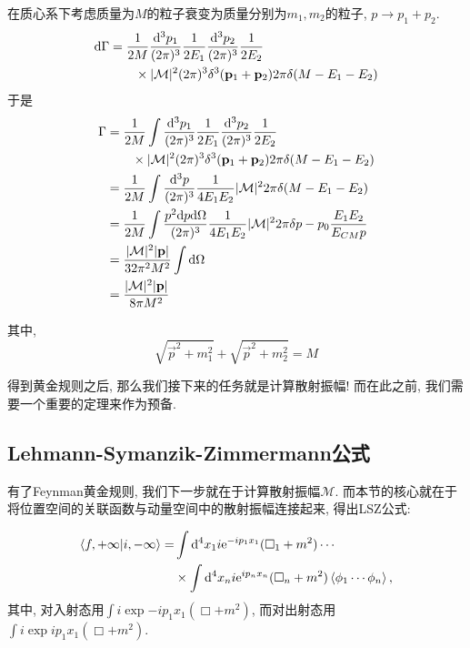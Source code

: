 \begin{example}[$1\rightarrow2$衰变]
    在质心系下考虑质量为$M$的粒子衰变为质量分别为$m_1, m_2$的粒子, $p\rightarrow p_1+p_2$.
    \begin{align}
        \mathrm d\Gamma&=\frac1{2M}\frac{\mathrm d^3p_1}{(2\pi)^{3}}\frac1{2E_1}\frac{\mathrm d^3p_2}{(2\pi)^{3}}\frac1{2E_2}\notag\\
        &\quad\quad\times|\mathcal M|^2(2\pi)^{3}\delta^3(\mathbf{p}_1+\mathbf{p}_2)2\pi\delta(M-E_1-E_2)
    \end{align}
    于是
    \begin{align}
        \Gamma&=\frac{1}{2M}\int\frac{\mathrm d^3p_1}{(2\pi)^{3}}\frac1{2E_1}\frac{\mathrm d^3p_2}{(2\pi)^{3}}\frac1{2E_2}\notag\\
        &\quad\quad\times|\mathcal M|^2(2\pi)^{3}\delta^3(\mathbf{p}_1+\mathbf{p}_2)2\pi\delta(M-E_1-E_2)\\
        &=\frac{1}{2M}\int\frac{\mathrm d^3p}{(2\pi)^{3}}\frac{1}{4E_1E_2}|\mathcal M|^2 2\pi\delta(M-E_1-E_2)\\
        &=\frac{1}{2M}\int\frac{p^2\mathrm d p\mathrm d\Omega}{(2\pi)^{3}}\frac{1}{4E_1E_2}|\mathcal M|^2 2\pi\delta{p-p_0}\frac{E_1E_2}{E_{CM}p}\\
        &=\frac{|\mathcal M|^2|\mathbf{p}|}{32\pi^2M^2}\int\mathrm d\Omega\\
        &=\frac{|\mathcal M|^2|\mathbf{p}|}{8\pi M^2}
    \end{align}

    其中, 
    \begin{equation}
        \sqrt{\vec p^2+m_1^2}+\sqrt{\vec p^2+m_2^2}=M
    \end{equation}
\end{example}

得到黄金规则之后, 那么我们接下来的任务就是计算散射振幅! 而在此之前, 我们需要一个重要的定理来作为预备.

\subsection{Lehmann-Symanzik-Zimmermann公式}
有了Feynman黄金规则, 我们下一步就在于计算散射振幅$\mathcal M$. 而本节的核心就在于将位置空间的关联函数与动量空间中的散射振幅连接起来, 得出LSZ公式:
\begin{theorem}\label{LSZformula-scalar}
    \begin{align}
        \braket{f, +\infty|i, -\infty}=&\int\mathrm d^4x_1 i\mathrm e^{-ip_1x_1}(\Box_1+m^2)\cdots\notag\\
        &\times\int\mathrm d^4x_n i\mathrm e^{ip_nx_n}(\Box_n+m^2)\braket{\phi_1\cdots\phi_n},\label{LSZformula-scalar-eq}
    \end{align}
    其中, 对入射态用$\int i\exp{-ip_1x_1}(\Box+m^2) $, 而对出射态用$\int i\exp{ip_1x_1}(\Box+m^2)$.
\end{theorem}

